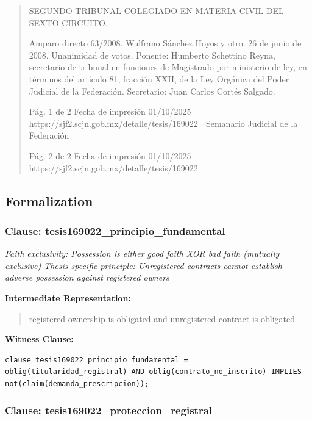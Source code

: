 \documentclass[11pt,a4paper]{article}
\begin{document}
\begin{quote}
SEGUNDO TRIBUNAL COLEGIADO EN MATERIA CIVIL DEL SEXTO CIRCUITO.


Amparo directo 63/2008. Wulfrano Sánchez Hoyos y otro. 26 de junio de 2008. Unanimidad de
votos. Ponente: Humberto Schettino Reyna, secretario de tribunal en funciones de Magistrado por
ministerio de ley, en términos del artículo 81, fracción XXII, de la Ley Orgánica del Poder Judicial de
la Federación. Secretario: Juan Carlos Cortés Salgado.




                                              Pág. 1 de 2             Fecha de impresión 01/10/2025
  https://sjf2.scjn.gob.mx/detalle/tesis/169022
                                                Semanario Judicial de la Federación




                                           Pág. 2 de 2       Fecha de impresión 01/10/2025
https://sjf2.scjn.gob.mx/detalle/tesis/169022

\end{quote}

\subsection{Formalization}

\subsubsection{Clause: tesis169022\_principio\_fundamental}

\textit{Faith exclusivity: Possession is either good faith XOR bad faith (mutually exclusive) Thesis-specific principle: Unregistered contracts cannot establish adverse possession against registered owners}

\textbf{Intermediate Representation:}

\begin{quote}
registered ownership is obligated and unregistered contract is obligated
\end{quote}

\textbf{Witness Clause:}

\begin{lstlisting}[style=witnessstyle, language=Witness]
clause tesis169022_principio_fundamental = oblig(titularidad_registral) AND oblig(contrato_no_inscrito) IMPLIES not(claim(demanda_prescripcion));
\end{lstlisting}

\subsubsection{Clause: tesis169022\_proteccion\_registral}
\end{document}
